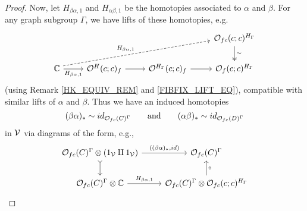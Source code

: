 \documentclass[a4paper,10pt
,draft
]{article}%
\renewcommand{\1}{\eta}%
\begin{document}
\begin{proof}
      Now, let $H_{\beta\alpha,1}$ and $H_{\alpha\beta,1}$ be the homotopies associated to $\alpha$ and $\beta$. 
      For any graph subgroup $\Gamma$, we have lifts of these homotopies, e.g.
      \begin{equation}
            \label{OFC_HOM_LIFT}
            \begin{tikzcd}
                  &&& \O_{f c}(c;c)^{H_\Gamma} \arrow[d, two heads, "\sim"]
                  \\
                  \mathbb C \arrow[r, "H_{\beta\alpha,1}"'] \arrow[urrr, dashed, shift left, "H_{\beta\alpha,1}"]
                  &
                  \O^H(c;c)_f \arrow[r]
                  &
                  \O^{H_\Gamma}(c;c)_f \arrow[r]
                  &
                  \O_f(c;c)^{H_\Gamma}
            \end{tikzcd}
      \end{equation}
      (using Remark \ref{HK_EQUIV_REM} and \eqref{FIBFIX_LIFT_EQ}), compatible with similar lifts of $\alpha$ and $\beta$.
      Thus we have an induced homotopies
      \[
            (\beta\alpha)_{\**} \sim id_{\O_{f c}(C)^{\Gamma}}
            \qquad \textrm{and} \qquad
            (\alpha\beta)_{\**} \sim id_{\O_{f c}(D)^\Gamma}
      \]
      in $\mathcal V$ via diagrams of the form, e.g.,
      \begin{equation}
            \begin{tikzcd}
                  \O_{f c}(C)^{\Gamma} \otimes (1_\V \amalg 1_\V) \arrow[d, tail] \arrow[r, "{((\beta\alpha)_{\**}, id)}"]
                  &
                  \O_{f c}(C)^\Gamma
                  \\                  
                  \O_{f c}(C)^\Gamma \otimes \mathbb C \arrow[r, "H_{\beta\alpha,1}"]
                  &
                  \O_{f c}(C)^\Gamma \otimes \O_{f c}(c;c)^{H_\Gamma} \arrow[u, "\circ"']
            \end{tikzcd}
      \end{equation}


\end{proof}
\end{document}

